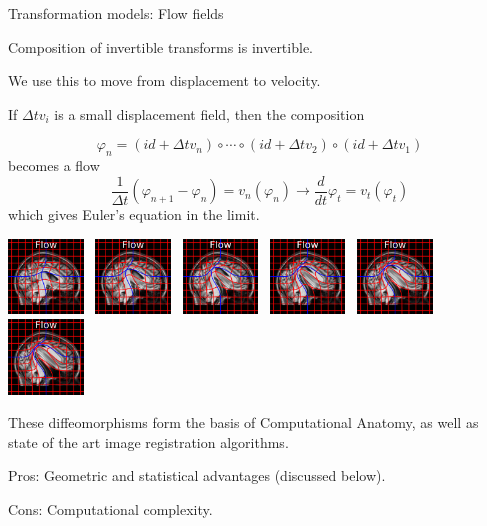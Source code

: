 \documentclass{beamer}
\begin{document}
\begin{frame}{Transformation models: Flow fields}

Composition of invertible transforms is invertible. 

We use this to move from displacement to velocity.  

If $\Delta t v_i$ is a small displacement field, then the composition

$$\varphi_n = (id + \Delta t v_n)\circ \cdots \circ (id + \Delta t v_2) \circ (id + \Delta t v_1)$$
becomes a flow
$$
\frac{1}{\Delta t} (\varphi_{n+1} - \varphi_n) = v_n( \varphi_n ) \to \frac{d}{dt}\varphi_t = v_t(\varphi_t) 
$$
which gives Euler's equation in the limit.


\includegraphics[width=0.15\textwidth]{tform_models_flow_1}~
\includegraphics[width=0.15\textwidth]{tform_models_flow_2}~
\includegraphics[width=0.15\textwidth]{tform_models_flow_3}~
\includegraphics[width=0.15\textwidth]{tform_models_flow_4}~
\includegraphics[width=0.15\textwidth]{tform_models_flow_5}~
\includegraphics[width=0.15\textwidth]{tform_models_flow_6}

These \alert{diffeomorphisms} form the basis of \alert{Computational Anatomy}, as well as state of the art image registration algorithms.

\alert{Pros}: Geometric and statistical advantages (discussed below).

\alert{Cons}: Computational complexity.

\end{frame}
\end{document}
